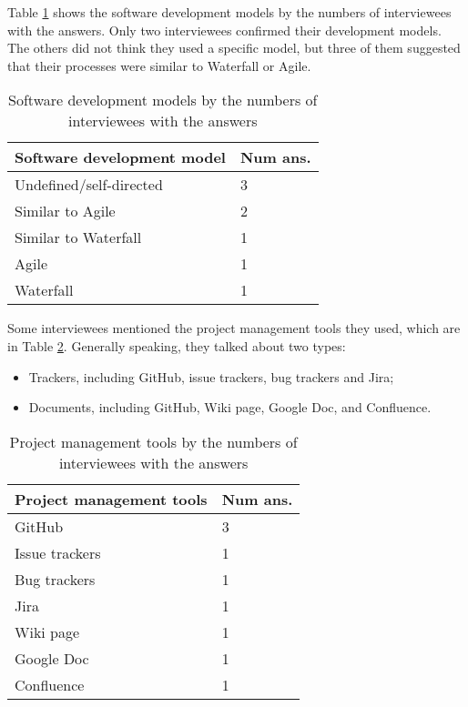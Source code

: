 Table \ref{tab_developmen_models} shows the software development models by the numbers of interviewees with the answers. Only two interviewees confirmed their development models. The others did not think they used a specific model, but three of them suggested that their processes were similar to Waterfall or 
Agile.

\begin{table}[H]
\centering
\begin{tabular}{ll}
\hline
Software development model & Num ans. \\ \hline
Undefined/self-directed & 3 \\
Similar to Agile & 2 \\
Similar to Waterfall & 1 \\
Agile & 1 \\
Waterfall & 1 \\ \hline
\end{tabular}
\caption{\label{tab_developmen_models}Software development models by the numbers of interviewees with the answers}
\end{table}

Some interviewees mentioned the project management tools they used, which are in Table \ref{tab_pm_tools}. Generally speaking, they talked about two types:

\begin{itemize}
\item Trackers, including GitHub, issue trackers, bug trackers and Jira;
\item Documents, including GitHub, Wiki page, Google Doc, and Confluence.
\end{itemize}

\begin{table}[H]
\centering
\begin{tabular}{ll}
\hline
Project management tools & Num ans. \\ \hline
GitHub & 3 \\
Issue trackers & 1 \\
Bug trackers & 1 \\
Jira & 1 \\
Wiki page & 1 \\
Google Doc & 1 \\
Confluence & 1 \\ \hline
\end{tabular}
\caption{\label{tab_pm_tools}Project management tools by the numbers of interviewees with the answers}
\end{table}

